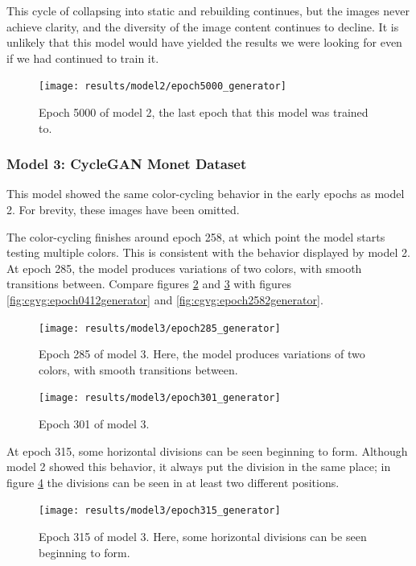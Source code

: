 \documentclass[11pt,letterpaper]{article}
\begin{document}
				This cycle of collapsing into static and rebuilding continues, but the images never achieve clarity, and the diversity of the image content continues to decline.
				It is unlikely that this model would have yielded the results we were looking for even if we had continued to train it.
				\begin{figure}
					\centering
					\texttt{[image: results/model2/epoch5000\_generator]}
					\caption{Epoch 5000 of model 2, the last epoch that this model was trained to.}
					\label{fig:cgvg:epoch5000generator}
				\end{figure}
			\subsubsection{Model 3: CycleGAN Monet Dataset}
				This model showed the same color-cycling behavior in the early epochs as model 2.
				For brevity, these images have been omitted.

				The color-cycling finishes around epoch 258, at which point the model starts testing multiple colors.
				This is consistent with the behavior displayed by model 2.
				At epoch 285, the model produces variations of two colors, with smooth transitions between.
				Compare figures \ref{fig:cgm:epoch285generator} and \ref{fig:cgm:epoch301generator} with figures \ref{fig:cgvg:epoch0412generator} and \ref{fig:cgvg:epoch2582generator}.
				\begin{figure}
					\centering
					\texttt{[image: results/model3/epoch285\_generator]}
					\caption{Epoch 285 of model 3. Here, the model produces variations of two colors, with smooth transitions between.}
					\label{fig:cgm:epoch285generator}
				\end{figure}
				\begin{figure}
					\centering
					\texttt{[image: results/model3/epoch301\_generator]}
					\caption{Epoch 301 of model 3.}
					\label{fig:cgm:epoch301generator}
				\end{figure}

				At epoch 315, some horizontal divisions can be seen beginning to form.
				Although model 2 showed this behavior, it always put the division in the same place; in figure \ref{fig:cgm:epoch315generator} the divisions can be seen in at least two different positions.
				\begin{figure}
					\centering
					\texttt{[image: results/model3/epoch315\_generator]}
					\caption[]{Epoch 315 of model 3. Here, some horizontal divisions can be seen beginning to form.}
					\label{fig:cgm:epoch315generator}
				\end{figure}
\end{document}
